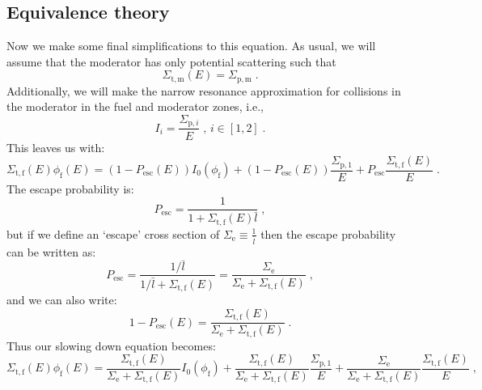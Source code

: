 \subsection{Equivalence theory}

Now we make some final simplifications to this equation. As usual, we will assume that the moderator has only potential scattering such that
\begin{equation*}
    \Sigma_{\mathrm{t,m}}(E) = \Sigma_\mathrm{p,m}\;\mathrm{.}
\end{equation*}
Additionally, we will make the narrow resonance approximation for collisions in the moderator in the fuel and moderator zones, i.e.,
\begin{equation*}
    I_i = \frac{\Sigma_{\mathrm{p},i}}{E}\;\text{, } i\in[1,2]\;\mathrm{.}
\end{equation*}
This leaves us with:
\begin{equation*}
    \Sigma_{\mathrm{t,f}}(E)\phi_\mathrm{f}(E) = (1-P_\mathrm{esc}(E))I_0(\phi_\mathrm{f}) + (1-P_\mathrm{esc}(E))\frac{\Sigma_{\mathrm{p},1}}{E} + P_\mathrm{esc}\frac{\Sigma_{\mathrm{t,f}}(E)}{E}\;\mathrm{.}
\end{equation*}
The escape probability is:
\begin{equation*}
    P_\mathrm{esc} = \frac{1}{1 + \Sigma_{\mathrm{t,f}}(E)\bar{l}}\;\mathrm{,}
\end{equation*}
but if we define an `escape' cross section of $\Sigma_\mathrm{e} \equiv \frac{1}{\bar{l}}$ then the escape probability can be written as:
\begin{equation*}
     P_\mathrm{esc} = \frac{1/\bar{l}}{1/\bar{l} + \Sigma_{\mathrm{t,f}}(E)} = \frac{\Sigma_\mathrm{e}}{\Sigma_\mathrm{e} + \Sigma_{\mathrm{t,f}}(E)}\;\mathrm{,}
\end{equation*}
and we can also write:
\begin{equation*}
    1-P_\mathrm{esc}(E) = \frac{\Sigma_\mathrm{t,f}(E)}{\Sigma_\mathrm{e} + \Sigma_{\mathrm{t,f}}(E)}\;\mathrm{.}
\end{equation*}
Thus our slowing down equation becomes:
\begin{equation*}
     \Sigma_{\mathrm{t,f}}(E)\phi_\mathrm{f}(E) = \frac{\Sigma_\mathrm{t,f}(E)}{\Sigma_\mathrm{e} + \Sigma_{\mathrm{t,f}}(E)}I_0(\phi_\mathrm{f}) + \frac{\Sigma_\mathrm{t,f}(E)}{\Sigma_\mathrm{e} + \Sigma_{\mathrm{t,f}}(E)}\frac{\Sigma_{\mathrm{p},1}}{E} + \frac{\Sigma_\mathrm{e}}{\Sigma_\mathrm{e} + \Sigma_{\mathrm{t,f}}(E)}\frac{\Sigma_{\mathrm{t,f}}(E)}{E}\;\mathrm{,}
\end{equation*}
